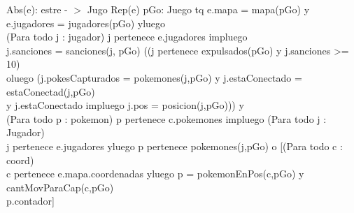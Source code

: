  Abs(e): estre - $>$ Jugo {Rep(e)} 
 pGo: Juego tq e.mapa = mapa(pGo) y e.jugadores = jugadores(pGo) yluego \\
 (Para todo j : jugador) j pertenece e.jugadores impluego 
 \\ j.sanciones = sanciones(j, pGo) ((j pertenece expulsados(pGo) y j.sanciones >= 10)\\
 oluego (j.pokesCapturados = pokemones(j,pGo) y j.estaConectado = estaConectad(j,pGo) \\
 y j.estaConectado impluego j.pos = posicion(j,pGo))) y \\
 (Para todo p : pokemon) p pertenece c.pokemones impluego (Para todo j : Jugador) \\
 j pertenece e.jugadores yluego p pertenece pokemones(j,pGo) o [(Para todo c : coord)\\
 c pertenece e.mapa.coordenadas yluego p = pokemonEnPos(c,pGo) y cantMovParaCap(c,pGo)\\
 p.contador]
 



%
%
%
%
